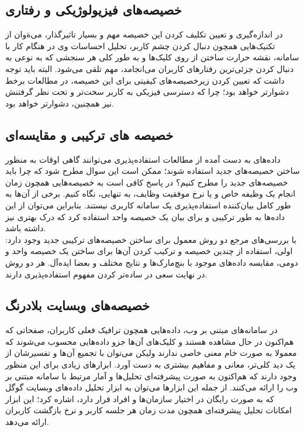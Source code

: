 \subsection{خصیصه‌های فیزیولوژیکی و رفتاری}
در اندازه‌گیری و تعیین تکلیف کردن این خصیصه مهم و بسیار تاثیرگذار، می‌ةوان از تکنیک‌هایی همچون دنبال کردن چشم کاربر، تحلیل احساسات وی در هنگام کار با سامانه، نقشه حرارت ساختن از روی کلیک‌ها و به طور کلی هر سنجشی که به نوعی به دنبال کردن جزئی‌ترین رفتارهای کاربران می‌انجامد، مهم تلقی می‌شود. البته باید توجه داشت که تعیین کردن زیرخصیصه‌های کیفیتی برای این خصیصه، در مطالعات برخط دشوارتر خواهد بود؛ چرا که دسترسی فیزیکی به کاربر سخت‌تر و تحت نظر گرفتنش نیز همچنین، دشوارتر خواهد بود.
\subsection{خصیصه های ترکیبی و مقایسه‌ای}
داده‌های به دست آمده از مطالعات استفاده‌پذیری می‌توانند گاهی اوقات به منظور ساختن خصیصه‌های جدید استفاده شوند؛ ممکن است این سوال مطرح شود که چرا باید خصیصه‌های جدید را مطرح کنیم؟ در پاسخ کافی است به خصیصه‌هایی همچون زمان انجام یک وظیفه خاص و یا نرخ موفقیت وظایف، به تنهایی، نگاه کنیم. برخی از آن‌ها به طور کامل بیان‌کننده استفاده‌پذیری یک سامانه کاربری نیستند. بنابراین می‌توان از این داده‌ها به طور ترکیبی و برای بیان یک خصیصه واحد استفاده کرد که درک بهتری نیز داشته باشد.\\
با بررسی‌های مرجع
\cite{albert_measuring_2013}
دو روش معمول برای ساختن خصیصه‌های ترکیبی جدید وجود دارد: اولی، استفاده از چندین خصیصه و ترکیب کردن ‌آن‌ها برای ساختن یک خصیصه واحد و دومی، مقایسه داده‌های موجود با بنچ‌مارک‌ها و نتایج مختلف و بعضا ایده‌آل. هر دو روش در نهایت سعی در ساده‌تر کردن مفهوم استفاده‌پذیری دارند.
\subsection{خصیصه‌های وبسایت بلادرنگ}
در سامانه‌های مبتنی بر وب، داده‌هایی همچون ترافیک فعلی کاربران، صفحاتی که هم‌اکنون در حال مشاهده هستند و کلیک‌های آن‌ها جزو داده‌هایی محسوب می‌شوند که معمولا به صورت خام معنی خاصی ندارند ولیکن می‌توان با تجمیع آن‌ها و تفسیرشان از یک دید کلی‌تر، معانی و مفاهیم بیشتری به دست آورد. ابزارهای زیادی برای این منظور وجود دارند که هم‌اکنون به صورت پیشرفته‌ای تحلیل‌ها و آمار مرتبط با سامانه مبتنی بر وب را ارائه می‌کنند. از جمله این ابزارها می‌توان به ابزار تحلیل داده‌های وبسایت گوگل که به صورت رایگان در اختیار سازمان‌ها و افراد قرار دارد، اشاره کرد؛ این ابزار امکانات تحلیل پیشرفته‌ای همچون مدت زمان هر جلسه کاربر
 و نرخ بازگشت کاربران ارائه می‌دهد.
